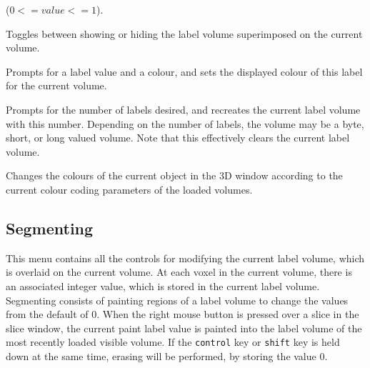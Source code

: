 \documentclass[11pt,letterpaper]{article}
\newcommand{\ident}[1]{{\tt #1}}
\newcommand{\menutwo}[2]{{\scriptsize \fbox{\bf #1}/\fbox{\bf #2}}}
\begin{document}
\begin{description}
  ($0 <= value <= 1$).
\item[\menutwo{Colour Coding}{Show Labels}]  Toggles between showing
  or hiding the label volume superimposed on the current
  volume.
\item[\menutwo{Colour Coding}{Set Paint Lbl Colour}]  Prompts for a
  label value and a colour, and sets the displayed
  colour of this label for the current volume.
\item[\menutwo{Colour Coding}{Num Labels}] Prompts for the number of
  labels desired, and recreates the current label volume with this
  number.  Depending on the number of labels, the volume may be a
  byte, short, or long valued volume.  Note that this effectively
  clears the current label volume.
\item[\menutwo{Colour Coding}{Colour Code Objects}]  Changes the
  colours of the current object in the 3D window according to the current
  colour coding parameters of the loaded volumes.
\end{description}

\subsection{Segmenting}

This menu contains all the controls for modifying the current label volume,
which is overlaid on the current volume.  At each voxel in the current
volume, there is an associated integer value, which is
stored in the current label volume.  Segmenting consists of painting regions
of a label volume to change the values from the default of 0.
When the right mouse button is pressed over a slice in the slice
window, the current paint label value is painted into the label volume of the
most recently loaded visible volume.  If the \ident{control} key or
\ident{shift} key is held down
at the same time, erasing will be performed, by storing the value 0.
\end{document}

